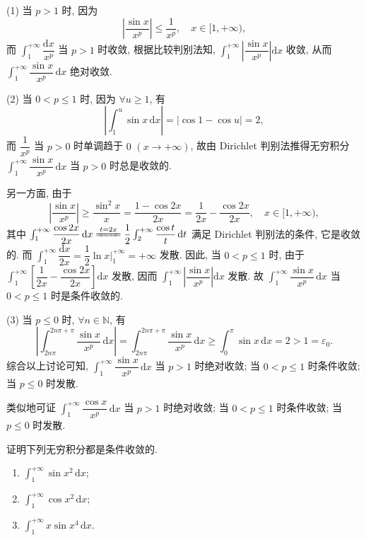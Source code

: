 \begin{solution}
(1) 当 $p>1$ 时, 因为
\[
\left|\frac{\sin x}{x^{p}}\right|\leqslant\frac{1}{x^{p}},\quad x\in[1,+\infty),
\]
而 $\int_{1}^{+\infty}\dfrac{\mathrm{d}x}{x^{p}}$ 当 $p>1$ 时收敛, 根据比较判别法知, $\int_{1}^{+\infty}\left|\dfrac{\sin x}{x^{p}}\right|\mathrm{d}x$ 收敛, 从而 $\int_{1}^{+\infty}\dfrac{\sin x}{x^{p}}\,\mathrm{d}x$ 绝对收敛.

(2) 当 $0<p\leqslant1$ 时, 因为 $\forall u\geqslant1$, 有
\[
\left|\int_{1}^{u}\sin x\,\mathrm{d}x\right|=\left|\cos1-\cos u\right|=2,
\]
而 $\dfrac{1}{x^{p}}$ 当 $p>0$ 时单调趋于 $0$ $(x\to+\infty)$, 故由 Dirichlet 判别法推得无穷积分 $\int_{1}^{+\infty}\dfrac{\sin x}{x^{p}}\,\mathrm{d}x$ 当 $p>0$ 时总是收敛的.

另一方面, 由于
\[
\left|\frac{\sin x}{x^{p}}\right|\geqslant\frac{\sin^{2}x}{x}=\frac{1-\cos2x}{2x}=\frac{1}{2x}-\frac{\cos2x}{2x},\quad x\in[1,+\infty),
\]
其中 $\int_{1}^{+\infty}\dfrac{\cos2x}{2x}\,\mathrm{d}x\xlongequal{t=2x}\dfrac{1}{2}\int_{2}^{+\infty}\dfrac{\cos t}{t}\,\mathrm{d}t$ 满足 Dirichlet 判别法的条件, 它是收敛的. 而 $\int_{1}^{+\infty}\dfrac{\mathrm{d}x}{2x}=\dfrac{1}{2}\ln x\bigg|_{1}^{+\infty}=+\infty$ 发散. 因此, 当 $0<p\leqslant1$ 时, 由于 $\int_{1}^{+\infty}\left[\dfrac{1}{2x}-\dfrac{\cos2x}{2x}\right]\mathrm{d}x$ 发散, 因而 $\int_{1}^{+\infty}\left|\dfrac{\sin x}{x^{p}}\right|\mathrm{d}x$ 发散. 故 $\int_{1}^{+\infty}\dfrac{\sin x}{x^{p}}\,\mathrm{d}x$ 当 $0<p\leqslant1$ 时是条件收敛的.

(3) 当 $p\leqslant0$ 时, $\forall n\in\mathbb{N}$, 有
\[
\left|\int_{2n\pi}^{2n\pi+\pi}\frac{\sin x}{x^{p}}\,\mathrm{d}x\right|=\int_{2n\pi}^{2n\pi+\pi}\frac{\sin x}{x^{p}}\,\mathrm{d}x\geqslant\int_{0}^{\pi}\sin x\,\mathrm{d}x=2>1=\varepsilon_{0}.
\]
综合以上讨论可知, $\int_{1}^{+\infty}\dfrac{\sin x}{x^{p}}\,\mathrm{d}x$ 当 $p>1$ 时绝对收敛; 当 $0<p\leqslant1$ 时条件收敛; 当 $p\leqslant0$ 时发散.

类似地可证 $\int_{1}^{+\infty}\dfrac{\cos x}{x^{p}}\,\mathrm{d}x$ 当 $p>1$ 时绝对收敛; 当 $0<p\leqslant1$ 时条件收敛; 当 $p\leqslant0$ 时发散.
\end{solution}

\begin{example}\label{ex:6.5.13}
证明下列无穷积分都是条件收敛的.
\begin{enumerate}[label=(\arabic*)]
\item $\int_{1}^{+\infty}\sin x^{2}\,\mathrm{d}x$;
\item $\int_{1}^{+\infty}\cos x^{2}\,\mathrm{d}x$;
\item $\int_{1}^{+\infty}x\sin x^{4}\,\mathrm{d}x$.
\end{enumerate}
\end{example}

